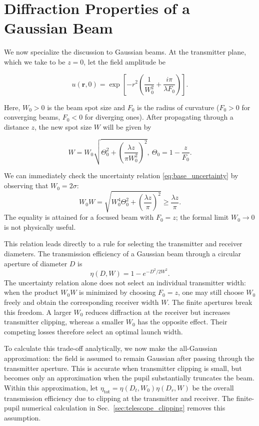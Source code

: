 \documentclass[a4paper,10pt]{article}
\begin{document}
\section{Diffraction Properties of a Gaussian Beam}

We now specialize the discussion to Gaussian beams. At the transmitter plane, which we take to be $z=0$, let the field amplitude be

\begin{equation}
    u(\mathbf{r}, 0) = \exp \left[-r^2\left( \frac{1}{W_0^2} + \frac{i\pi}{\lambda F_0} \right) \right].
\end{equation}

Here, $W_0 >0$ is the beam spot size and $F_0$ is the radius of curvature ($F_0 > 0$  for converging beams, $F_0 <0$ for diverging ones). After propagating through a distance $z$, the new spot size $W$ will be given by

\begin{equation}
    \label{eq:gaussian_spot_size}
    W = W_0\sqrt{\Theta_0^2 + \left(\frac{\lambda z}{\pi W_0^2} \right)^2}, \ \Theta_0 = 1 - \frac{z}{F_0}.
\end{equation}

We can immediately check the uncertainty relation \eqref{eq:base_uncertainty} by observing that $W_0 = 2\sigma$:
\begin{equation}
    W_0 W = \sqrt{W_0^4\Theta_0^2 + \left(\frac{\lambda z}{\pi} \right)^2} \ge \frac{\lambda z}{\pi}.
\end{equation}
The equality is attained for a focused beam with $F_0=z$; the formal limit $W_0\to 0$ is not physically useful.

This relation leads directly to a rule for selecting the transmitter and receiver diameters. The transmission efficiency of a Gaussian beam through a circular aperture of diameter $D$ is
\begin{equation}
    \eta(D, W) = 1 - e^{-D^2/2W^2}.
\end{equation}
The uncertainty relation alone does not select an individual transmitter width: when the product $W_0W$ is minimized by choosing $F_0=z$, one may still choose $W_0$ freely and obtain the corresponding receiver width $W$. The finite apertures break this freedom. A larger $W_0$ reduces diffraction at the receiver but increases transmitter clipping, whereas a smaller $W_0$ has the opposite effect. Their competing losses therefore select an optimal launch width.

To calculate this trade-off analytically, we now make the all-Gaussian approximation: the field is assumed to remain Gaussian after passing through the transmitter aperture. This is accurate when transmitter clipping is small, but becomes only an approximation when the pupil substantially truncates the beam. Within this approximation, let $\eta_{\mathrm{tot}} = \eta(D_t,W_0)\eta(D_r,W)$ be the overall transmission efficiency due to clipping at the transmitter and receiver. The finite-pupil numerical calculation in Sec.~\ref{sec:telescope_clipping} removes this assumption.
\end{document}

